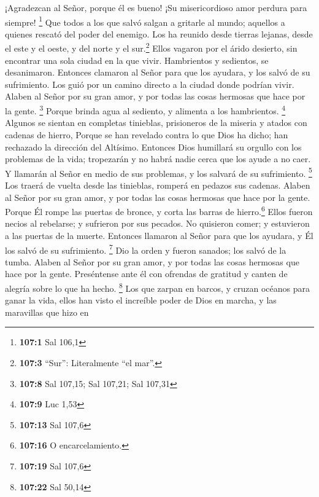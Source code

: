  ¡Agradezcan al Señor, porque él es bueno! ¡Su
misericordioso amor perdura para siempre! \footnote{\textbf{107:1} Sal
  106,1}  Que todos a los que salvó salgan a gritarle al
mundo; aquellos a quienes rescató del poder del enemigo. 
Los ha reunido desde tierras lejanas, desde el este y el oeste, y del
norte y el sur.\footnote{\textbf{107:3} ``Sur'': Literalmente ``el
  mar''.}  Ellos vagaron por el árido desierto, sin
encontrar una sola ciudad en la que vivir.  Hambrientos y
sedientos, se desanimaron.  Entonces clamaron al Señor
para que los ayudara, y los salvó de su sufrimiento.  Los
guió por un camino directo a la ciudad donde podrían vivir.
 Alaben al Señor por su gran amor, y por todas las cosas
hermosas que hace por la gente. \footnote{\textbf{107:8} Sal 107,15; Sal
  107,21; Sal 107,31}  Porque brinda agua al sediento, y
alimenta a los hambrientos. \footnote{\textbf{107:9} Luc 1,53}
 Algunos se sientan en completas tinieblas, prisioneros
de la miseria y atados con cadenas de hierro,  Porque se
han revelado contra lo que Dios ha dicho; han rechazado la dirección del
Altísimo.  Entonces Dios humillará su orgullo con los
problemas de la vida; tropezarán y no habrá nadie cerca que los ayude a
no caer.  Y llamarán al Señor en medio de sus problemas,
y los salvará de su sufrimiento. \footnote{\textbf{107:13} Sal 107,6}
 Los traerá de vuelta desde las tinieblas, romperá en
pedazos sus cadenas.  Alaben al Señor por su gran amor, y
por todas las cosas hermosas que hace por la gente. 
Porque Él rompe las puertas de bronce, y corta las barras de
hierro.\footnote{\textbf{107:16} O encarcelamiento.} 
Ellos fueron necios al rebelarse; y sufrieron por sus pecados.
 No quisieron comer; y estuvieron a las puertas de la
muerte.  Entonces llamaron al Señor para que los ayudara,
y Él los salvó de su sufrimiento. \footnote{\textbf{107:19} Sal 107,6}
 Dio la orden y fueron sanados; los salvó de la tumba.
 Alaben al Señor por su gran amor, y por todas las cosas
hermosas que hace por la gente.  Preséntense ante él con
ofrendas de gratitud y canten de alegría sobre lo que ha hecho.
\footnote{\textbf{107:22} Sal 50,14}  Los que zarpan en
barcos, y cruzan océanos para ganar la vida,  ellos han
visto el increíble poder de Dios en marcha, y las maravillas que hizo en
